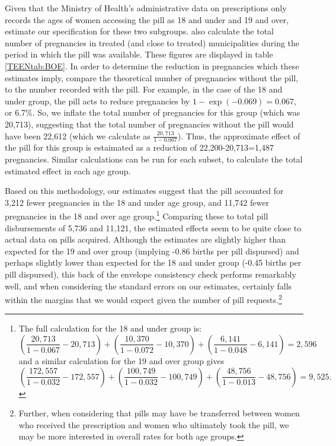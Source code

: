 Given that the Ministry of Health's administrative data on prescriptions only
records the ages of women accessing the pill as 18 and under and 19 and over,
\person estimate our specification for these two subgroups.  \Person also
calculate the total number of pregnancies in treated (and close to treated)
municipalities during the period in which the pill was available.  These 
figures are displayed in table \ref{TEENtab:BOE}.  In order to determine the
reduction in pregnancies which these estimates imply, \person compare the 
theoretical number of pregnancies without the pill, to the number recorded 
with the pill.  For example, in the case of the 18 and under group, the pill acts 
to reduce pregnancies by $1-\exp(-0.069)=0.067$, or 6.7\%.  So, we inflate the 
total number of pregnancies for this group (which was 20,713), suggesting that 
the total number of pregnancies without the pill would have been 22,612 (which
we calculate as $\frac{20,713}{1-0.067}$).  Thus, the approximate effect of the 
pill for this group is estaimated as a reduction of 22,200-20,713=1,487
pregnancies.  Similar calculations can be run for each subset, to calculate the
total estimated effect in each age group.

Based on this methodology, our estimates suggest that the pill accounted for 
3,212 fewer pregnancies in the 18 and under age group, and 11,742 fewer 
pregnancies in the 18 and over age group.\footnote{The full calculation for the 
18 and under group is:
\begin{equation}
\nonumber
\left(\frac{20,713}{1-0.067}-20,713\right)+
\left(\frac{10,370}{1-0.072}-10,370\right)+
\left(\frac{6,141}{1-0.048}-6,141\right)=2,596
\end{equation}
and a similar calculation for the 19 and over group gives 
\begin{equation}
\nonumber
\left(\frac{172,557}{1-0.032}-172,557\right)+
\left(\frac{100,749}{1-0.032}-100,749\right)+
\left(\frac{48,756}{1-0.013}-48,756\right)=9,525.
\end{equation}
}
Comparing these to total pill disbursements of 5,736 and 11,121, the estimated
effects seem to be quite close to actual data on pills acquired.  Although the
estimates are slightly higher than expected for the 19 and over group (implying
-0.86 births per pill dispursed) and perhaps slightly lower than expected for the
18 and under group (-0.45 births per pill dispursed), this back of the envelope 
consistency check performs remarkably well, and when considering the standard 
errors on our estimates, certainly falls within the margins that we would expect
given the number of pill requests.\footnote{Further, when considering that
pills may have be transferred between women who received the prescription and
women who ultimately took the pill, we may be more interested in overall rates
for both age groups.}

